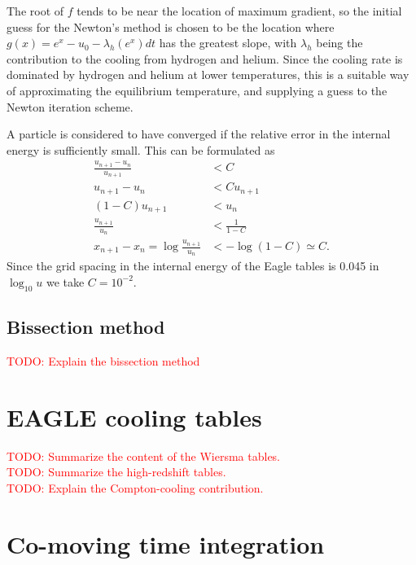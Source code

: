 \documentclass[fleqn, usenatbib, useAMS, a4paper]{mnras}
\newcommand{\todo}[1]{{\textcolor{red}{TODO: #1}\\}}
\newcommand{\LL}{\left(}
\newcommand{\RR}{\right)}
\begin{document}
The root of $f$ tends to be near the location of maximum gradient, so
the initial guess for the Newton's method is chosen to be the location
where $g(x) = e^x - u_0 - \lambda_h(e^x) dt$ has the greatest slope,
with $\lambda_h$ being the contribution to the cooling from hydrogen
and helium. Since the cooling rate is dominated by hydrogen and helium
at lower temperatures, this is a suitable way of approximating the
equilibrium temperature, and supplying a guess to the Newton iteration
scheme.

A particle is considered to have converged if the relative error in
the internal energy is sufficiently small. This can be formulated as
\begin{align*}
\frac{u_{n+1} - u_n}{u_{n+1}} &< C \\
u_{n+1} - u_n &< Cu_{n+1} \\
\LL 1-C\RR u_{n+1} &< u_n \\
\frac{u_{n+1}}{u_n} &< \frac{1}{1-C} \\
x_{n+1} - x_n = \log\frac{u_{n+1}}{u_n} &< -\log\LL 1-C \RR \simeq C.
\end{align*}
Since the grid spacing in the internal energy of the Eagle tables is
0.045 in $\log_{10}u$ we take $C = 10^{-2}$.

\subsection{Bissection method}

\todo{Explain the bissection method}

\section{EAGLE cooling tables}

\todo{Summarize the content of the Wiersma tables.}
\todo{Summarize the high-redshift tables.}
\todo{Explain the Compton-cooling contribution.}

\section{Co-moving time integration}
\end{document}
